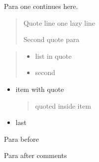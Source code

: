 Para one continues here.

\begin{quote}
Quote line one lazy line

Second quote para
\end{quote}

\begin{quote}
\begin{itemize}
\tightlist
\item
  list in quote
\item
  second
\end{itemize}
\end{quote}

\begin{itemize}
\item
  item with quote

  \begin{quote}
  quoted inside item
  \end{quote}
\item
  last
\end{itemize}

Para before

Para after comments
